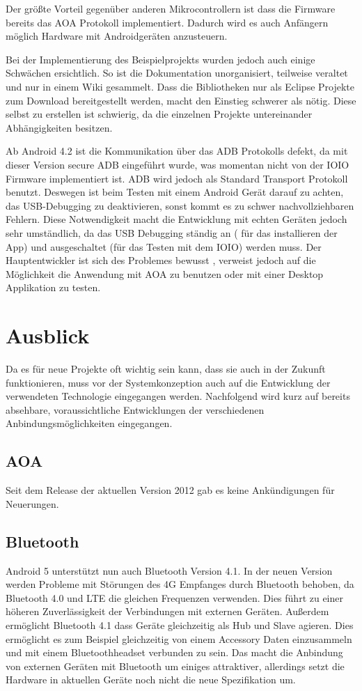 \documentclass[12pt,journal,compsoc]{IEEEtran}
\begin{document}
Der größte Vorteil gegenüber anderen Mikrocontrollern ist dass die Firmware bereits das AOA Protokoll implementiert. Dadurch wird es auch Anfängern möglich Hardware mit Androidgeräten anzusteuern. 

Bei der Implementierung des Beispielprojekts wurden jedoch auch einige Schwächen ersichtlich.
So ist die Dokumentation unorganisiert, teilweise veraltet und nur in einem Wiki gesammelt.
Dass die Bibliotheken nur als Eclipse Projekte zum Download bereitgestellt werden, macht den Einstieg schwerer als nötig. Diese selbst zu erstellen ist schwierig, da die einzelnen Projekte untereinander Abhängigkeiten besitzen.

Ab Android 4.2 ist die Kommunikation über das ADB Protokolls defekt, da mit dieser Version secure ADB eingeführt wurde, was momentan nicht von der IOIO Firmware implementiert ist. ADB wird jedoch als Standard Transport Protokoll benutzt.
Deswegen ist beim Testen mit einem Android Gerät darauf zu achten, das USB-Debugging zu deaktivieren, sonst kommt es zu schwer nachvollziehbaren Fehlern.
Diese Notwendigkeit macht die Entwicklung mit echten Geräten jedoch sehr umständlich, da das USB Debugging ständig an ( für das installieren der App) und ausgeschaltet (für das Testen mit dem IOIO) werden muss.
Der Hauptentwickler ist sich des Problemes bewusst \cite{adbbroken}, verweist jedoch auf die Möglichkeit die Anwendung mit AOA zu benutzen oder mit einer Desktop Applikation zu testen. 

\section{Ausblick}
Da es für neue Projekte oft wichtig sein kann, dass sie auch in der Zukunft funktionieren, muss vor der Systemkonzeption auch auf die Entwicklung der verwendeten Technologie eingegangen werden.
Nachfolgend wird kurz auf bereits absehbare, voraussichtliche Entwicklungen der verschiedenen Anbindungsmöglichkeiten eingegangen. 
\subsection{AOA}
Seit dem Release der aktuellen Version 2012 gab es keine Ankündigungen für Neuerungen.
\subsection{Bluetooth}
Android 5 unterstützt nun auch Bluetooth Version 4.1. In der neuen Version werden Probleme mit Störungen des 4G Empfanges durch Bluetooth behoben, da Bluetooth 4.0 und LTE die gleichen Frequenzen verwenden.
Dies führt zu einer höheren Zuverlässigkeit der Verbindungen mit externen Geräten.
Außerdem ermöglicht Bluetooth 4.1 dass Geräte gleichzeitig als Hub und Slave agieren.
Dies ermöglicht es zum Beispiel gleichzeitig von einem Accessory Daten einzusammeln und mit einem Bluetoothheadset verbunden zu sein.
Das macht die Anbindung von externen Geräten mit Bluetooth um einiges attraktiver, allerdings setzt die Hardware in aktuellen Geräte noch nicht die neue Spezifikation um.
\end{document}
